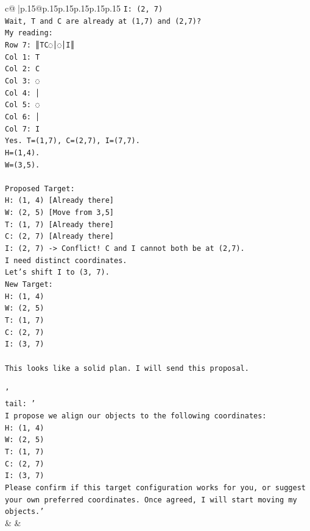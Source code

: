 \documentclass{article}
\begin{document}
{\begin{supertabular}{c@{$\;$}|p{.15\linewidth}@{}p{.15\linewidth}p{.15\linewidth}p{.15\linewidth}p{.15\linewidth}p{.15\linewidth}}
{{{\texttt{I: (2, 7)} \\
\texttt{Wait, T and C are already at (1,7) and (2,7)?} \\
\texttt{My reading:} \\
\texttt{Row 7: ║TC◌│◌│I║} \\
\texttt{Col 1: T} \\
\texttt{Col 2: C} \\
\texttt{Col 3: ◌} \\
\texttt{Col 4: │} \\
\texttt{Col 5: ◌} \\
\texttt{Col 6: │} \\
\texttt{Col 7: I} \\
\texttt{Yes. T=(1,7), C=(2,7), I=(7,7).} \\
\texttt{H=(1,4).} \\
\texttt{W=(3,5).} \\
\\ 
\texttt{Proposed Target:} \\
\texttt{H: (1, 4) {[}Already there{]}} \\
\texttt{W: (2, 5) {[}Move from 3,5{]}} \\
\texttt{T: (1, 7) {[}Already there{]}} \\
\texttt{C: (2, 7) {[}Already there{]}} \\
\texttt{I: (2, 7) {-}> Conflict! C and I cannot both be at (2,7).} \\
\texttt{I need distinct coordinates.} \\
\texttt{Let's shift I to (3, 7).} \\
\texttt{New Target:} \\
\texttt{H: (1, 4)} \\
\texttt{W: (2, 5)} \\
\texttt{T: (1, 7)} \\
\texttt{C: (2, 7)} \\
\texttt{I: (3, 7)} \\
\\ 
\texttt{This looks like a solid plan. I will send this proposal.} \\
\\ 
\texttt{'} \\
\texttt{tail: '} \\
\texttt{I propose we align our objects to the following coordinates:} \\
\texttt{H: (1, 4)} \\
\texttt{W: (2, 5)} \\
\texttt{T: (1, 7)} \\
\texttt{C: (2, 7)} \\
\texttt{I: (3, 7)} \\
\texttt{Please confirm if this target configuration works for you, or suggest your own preferred coordinates. Once agreed, I will start moving my objects.'} \\
            }
        }
    }
    & & \\ \\


\end{supertabular}}
\end{document}
